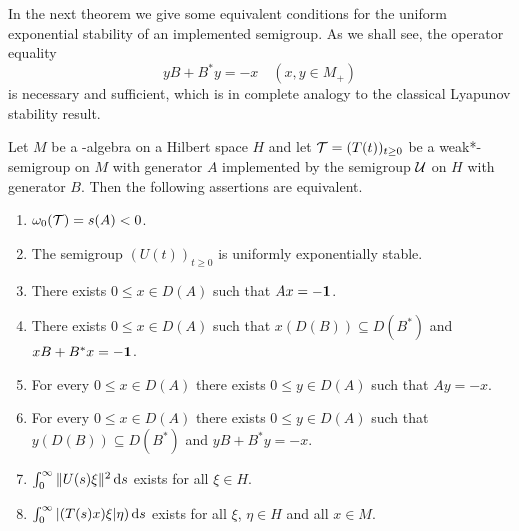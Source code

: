 In the next theorem we give some equivalent conditions for the uniform exponential stability of an implemented semigroup.
As we shall see, the operator equality
\[
yB + B^{*}y = -x \quad (x, y \in M_{+})
\]
is necessary and sufficient, which is in complete analogy to the classical Lyapunov stability result.
\begin{theorem}\label{thm:d4-2.2}
Let $M$ be a \WA-algebra on a Hilbert space $H$ and let $\TT = (T(t))_{t \geq 0}$ be a weak*-semigroup on $M$ with generator $A$ implemented by the semigroup $\mathcal{U}$ on $H$ with generator $B$.
Then the following assertions are equivalent.
\begin{enumerate}[\upshape (a)]

\item\label{item:d4-2.2-a}
$\omega_{0}(\mathcal{T}) = s(A) < 0$.

\item\label{item:d4-2.2-b}
The semigroup $(U(t))_{t \geq 0}$ is uniformly exponentially stable.

\item\label{item:d4-2.2-c}
There exists $0 \leq x \in D(A)$ such that $Ax = -\mathbf{1}$.

\item\label{item:d4-2.2-d}
There exists $0 \leq x \in D(A)$ such that $x(D(B)) \subseteq D(B^{*})$ \mbox{and $xB+B^{*}x = -\mathbf{1}$}.

\item\label{item:d4-2.2-e}
For every $0 \leq x \in D(A)$ there exists $0 \leq y \in D(A)$ such that $Ay = -x$.

\item\label{item:d4-2.2-f}
For every $0 \leq x \in D(A)$ there exists $0 \leq y \in D(A)$ such that $y(D(B)) \subseteq D(B^{*})$ and $yB+B^{*}y = -x$.

\item\label{item:d4-2.2-g}
$\int_{0}^{\infty} \|U(s)\xi\|^2 \mathop{}\!\mathrm{d}{s}$ exists for all $\xi \in H$.

\item\label{item:d4-2.2-h}
$\int_{0}^{\infty} |(T(s)x)\xi|\eta) \mathop{}\!\mathrm{d}{s}$ exists for all $\xi$, $\eta \in H$ and all $x \in M$.
\end{enumerate}
\end{theorem}
